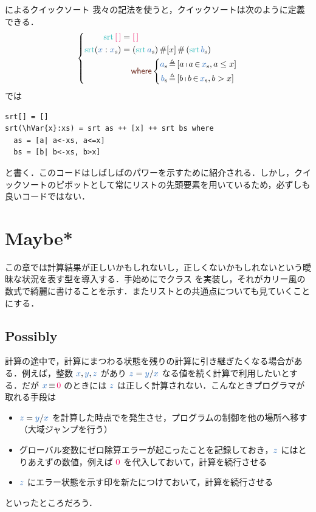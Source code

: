 \documentclass[a5paper,twoside,fleqn,draft]{jsbook}
\begin{document}
\begin{note}{\haskell によるクイックソート}
我々の記法を使うと，クイックソートは次のように定義できる．
\begin{equation*}
  \left\{
  \begin{aligned}
    \mSort{\hEmptyList}
    &={\hEmptyList}\\
    \mSort(\hVar{x}:\hListVar{x})
    &=(\mSort\hListVar{a})\hAppend[x]\hAppend{}(\mSort\hListVar{b})\\
    &\quad\mWhere\left\{\begin{aligned}
    \hListVar{a}&\mLetEq{}[a\mListComp a\mFrom\hListVar{x},a\le x]\\
    \hListVar{b}&\mLetEq{}[b\mListComp b\mFrom\hListVar{x},b>x]
    \end{aligned}
    \right.
  \end{aligned}
  \right.
\end{equation*}
\haskell では %
\begin{haskellcode}
\begin{verbatim}
srt[] = []
srt(\hVar{x}:xs) = srt as ++ [x] ++ srt bs where
  as = [a| a<-xs, a<=x]
  bs = [b| b<-xs, b>x]
\end{verbatim}
\end{haskellcode}
と書く．このコードはしばしば\haskell のパワーを示すために紹介される．しかし，クイックソートのピボットとして常にリストの先頭要素を用いているため，必ずしも良いコードではない．
\end{note}

\chapter{Maybe*}
\label{ch:maybe}

\begin{leader}
この章では計算結果が正しいかもしれないし，正しくないかもしれないという曖昧な状況を表す型を導入する．手始めに\python でクラス  を実装し，それがカリー風の数式で綺麗に書けることを示す．またリストとの共通点についても見ていくことにする．
\end{leader}

\section{Possibly}

計算の途中で，計算にまつわる状態を残りの計算に引き継ぎたくなる場合がある．例えば，整数 $\hVar{x},\hVar{y},\hVar{z}$ があり $\hVar{z}=\hVar{y}/\hVar{x}$ なる値を続く計算で利用したいとする．だが $\hVar{x}\hIfEq\hConstant{0}$ のときには $\hVar{z}$ は正しく計算されない．こんなときプログラマが取れる手段は
\begin{itemize}
\item $\hVar{z}=\hVar{y}/\hVar{x}$ を計算した時点でを発生させ，プログラムの制御を他の場所へ移す（大域ジャンプを行う）
\item グローバル変数にゼロ除算エラーが起こったことを記録しておき，$\hVar{z}$ にはとりあえずの数値，例えば $\hConstant{0}$ を代入しておいて，計算を続行させる
\item $\hVar{z}$ にエラー状態を示す印を新たにつけておいて，計算を続行させる
\end{itemize}
といったところだろう．
\end{document}

